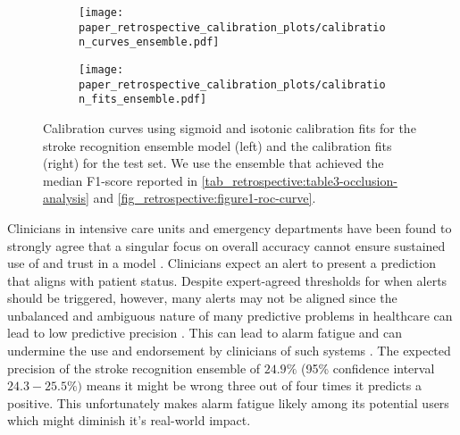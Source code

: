 \begin{figure}
    \begin{subfigure}[c]{0.48\columnwidth}
        \centering
        \texttt{[image: paper\_retrospective\_calibration\_plots/calibration\_curves\_ensemble.pdf]}
    \end{subfigure}    
    \begin{subfigure}[c]{0.48\columnwidth}
        \centering
        \texttt{[image: paper\_retrospective\_calibration\_plots/calibration\_fits\_ensemble.pdf]}
    \end{subfigure}    
    \caption[Calibration fits and curves for the stroke recognition ensemble using Platt-scaling and isotonic regression for calibration.]{ Calibration curves using sigmoid and isotonic calibration fits for the stroke recognition ensemble model (left) and the calibration fits (right) for the test set. We use the ensemble that achieved the median F1-score reported in \cref{tab_retrospective:table3-occlusion-analysis} and \cref{fig_retrospective:figure1-roc-curve}.}
    \label{fig_discussion:retrospective-paper-calibration-curve-sigmoid-isotonic}
\end{figure}    

Clinicians in intensive care units and emergency departments have been found to strongly agree that a singular focus on overall accuracy cannot ensure sustained use of and trust in a model \cite{tonekaboni_what_2019}. Clinicians expect an alert to present a prediction that aligns with patient status. Despite expert-agreed thresholds for when alerts should be triggered, however, many alerts may not be aligned since the unbalanced and ambiguous nature of many predictive problems in healthcare can lead to low predictive precision \parencite{umscheid_development_2015, cite14, cite15, wenstrup_retrospective_2023}. This can lead to alarm fatigue \parencite{embi_evaluating_2012} and can undermine the use and endorsement by clinicians of such systems \parencite{guidi_clinician_2015}. 
The expected precision of the stroke recognition ensemble of $24.9\%$ (95\% confidence interval $24.3-25.5\%)$ means it might be wrong three out of four times it predicts a positive. This unfortunately makes alarm fatigue likely among its potential users which might diminish it's real-world impact.

